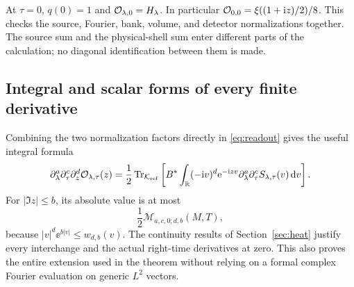 At $\tau=0$, $q(0)=1$ and $\mathcal O_{\lambda,0}=H_\lambda$.
In particular $\mathcal O_{0,0}=\xi((1+\mathrm i z)/2)/8$. This checks the
source, Fourier, bank, volume, and detector normalizations together.
The source sum and the physical-shell sum enter different parts of
the calculation; no diagonal identification between them is made.

\subsection{Integral and scalar forms of every finite derivative}

Combining the two normalization factors directly in
\eqref{eq:readout} gives the useful integral formula
\begin{equation}
 \partial_\lambda^a\partial_\tau^c\partial_z^d\mathcal O_{\lambda,\tau}(z)
 =\frac12\operatorname{Tr}_{\mathcal K_{\mathrm{ref}}}\left[
 B^*\int_\mathbb R(-\mathrm i v)^d\mathrm e^{-\mathrm i zv}
       \partial_\lambda^a\partial_\tau^cS_{\lambda,\tau}(v)\,\mathrm d v
 \right].
 \label{eq:readout-derivative}
\end{equation}
For $|\Im z|\le b$, its absolute value is at most
\begin{equation}
 \frac12\mathcal M_{a,c,0;d,b}(M,T),
 \label{eq:readout-majorant}
\end{equation}
because $|v|^d\ee^{b|v|}\le w_{d,b}(v)$. The continuity results of
Section~\ref{sec:heat} justify every interchange and the actual
right-time derivatives at zero. This also proves the entire extension
used in the theorem without relying on a formal complex Fourier
evaluation on generic $L^2$ vectors.

